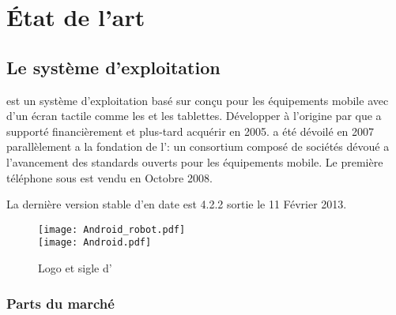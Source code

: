 
\chapter{État de l'art}
\section{Le système d'exploitation \android}
\android est un système d'exploitation basé sur  conçu pour les équipements mobile avec d'un écran tactile comme les  et les tablettes. Développer à l'origine par  que  a supporté financièrement et plus-tard acquérir en 2005. \android a été dévoilé en 2007 parallèlement a la fondation de l': un consortium composé de sociétés dévoué a l'avancement des standards ouverts pour les équipements mobile. Le première téléphone sous \android est vendu en Octobre 2008.

La dernière version stable d'\android en date est 4.2.2  sortie le 11 Février 2013.
\begin{figure}
\begin{center}
\texttt{[image: Android\_robot.pdf]}\\
\texttt{[image: Android.pdf]}
\end{center}
\caption{Logo et sigle d'\android}
\end{figure}

\subsection{Parts du marché}

